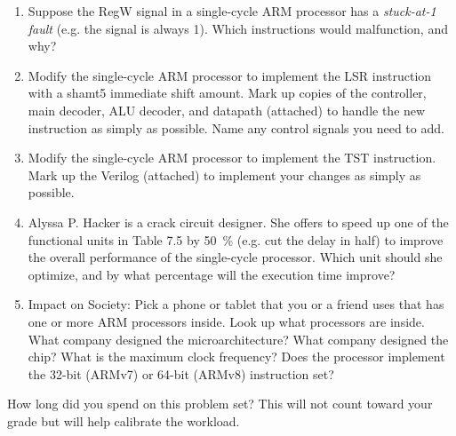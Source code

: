 \documentclass{ps}
\date{2019}
\author{}
\begin{document}
\begin{enumerate}
\item Suppose the RegW signal in a single-cycle ARM processor has a
  \emph{stuck-at-1 fault} (e.g. the signal is always 1).  Which
  instructions would malfunction, and why?

  \begin{solution}
  \end{solution}

\item Modify the single-cycle ARM processor to implement the LSR
  instruction with a shamt5 immediate shift amount.  Mark up copies of
  the controller, main decoder, ALU decoder, and datapath (attached)
  to handle the new instruction as simply as possible.  Name any
  control signals you need to add.

  \begin{solution}
  \end{solution}

\item Modify the single-cycle ARM processor to implement the TST
  instruction.  Mark up the Verilog (attached) to implement your
  changes as simply as possible.

  \begin{solution}
  \end{solution}

\item Alyssa P. Hacker is a crack circuit designer.  She offers to
  speed up one of the functional units in Table 7.5 by
  \SI{50}{\percent} (e.g. cut the delay in half) to improve the
  overall performance of the single-cycle processor.  Which unit
  should she optimize, and by what percentage will the execution time
  improve?

  \begin{solution}
  \end{solution}

\item Impact on Society: Pick a phone or tablet that you or a friend
  uses that has one or more ARM processors inside.  Look up what
  processors are inside.  What company designed the microarchitecture?
  What company designed the chip?  What is the maximum clock
  frequency?  Does the processor implement the 32-bit (ARMv7) or
  64-bit (ARMv8) instruction set?

  \begin{solution}
  \end{solution}
\end{enumerate}

How long did you spend on this problem set?  This will not count
toward your grade but will help calibrate the workload.
\begin{solution}
\end{solution}
\end{document}
